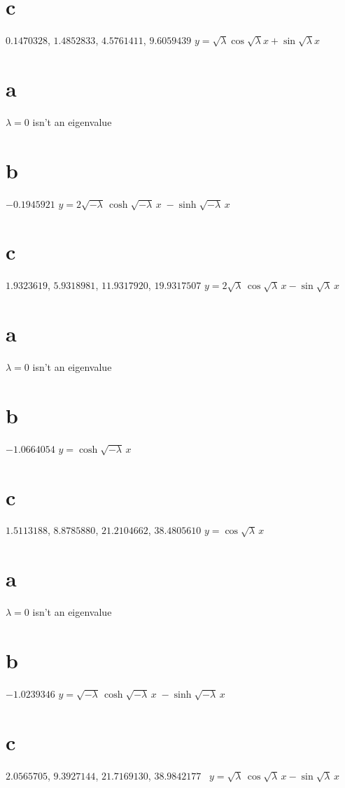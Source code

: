 \part{c} $0.
1470328$, $1.4852833$, $4.5761411$,
$9.6059439  $\;
$y=\sqrt\lambda\cos\sqrt\lambda x+\sin\sqrt\lambda x$

\smallskip

 \part{a} $\lambda=0$ isn't  an eigenvalue\;   \part{b} 
$-0.1945921$
$y=2\sqrt{-\lambda}\,\cosh \sqrt{-\lambda}\,x\;
-\sinh\sqrt{-\lambda}\,x$
\part{c} $1.9323619$, $5.9318981$, $11.9317920$,
 $19.9317507$
$y=2\sqrt{\lambda}\,\cos \sqrt{\lambda}\,x-\sin\sqrt{\lambda}\,x$

\smallskip

 \part{a} $\lambda=0$ isn't  an eigenvalue\;
 \part{b} $-1.0664054$   $y=\cosh\sqrt{-\lambda}\,x$\;
\part{c} $1.5113188$,
$8.8785880$, $21.2104662$, $38.4805610$
$y=\cos\sqrt{\lambda}\,x$
\smallskip

 \part{a} $\lambda=0$ isn't  an eigenvalue\;
\part{b}  $-1.0239346$\;
$y=\sqrt{-\lambda}\,\cosh \sqrt{-\lambda}\,x\;
-\sinh\sqrt{-\lambda}\,x$
\part{c} $2.0565705$, $9.3927144$, $21.7169130$,
$38.9842177$  \,
$y=\sqrt{\lambda}\,\cos \sqrt{\lambda}\,x-\sin\sqrt{\lambda}\,x$

